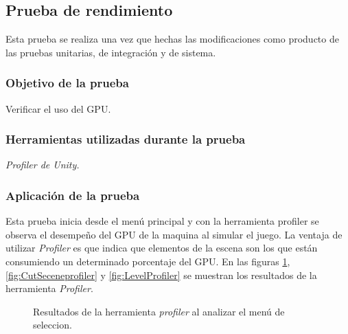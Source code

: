 \subsection{Prueba de rendimiento}
Esta prueba se realiza una vez que hechas las modificaciones como producto de las pruebas unitarias, de integración y de sistema.
\subsubsection{Objetivo de la prueba}
Verificar el uso del GPU. 
\subsubsection{Herramientas utilizadas durante la prueba}
\textit{Profiler de Unity.}
\subsubsection{Aplicación de la prueba}
Esta prueba inicia desde el menú principal y con la herramienta profiler se 
observa el desempeño del GPU de la maquina al simular el juego. La ventaja de utilizar 
\textit{Profiler} es que indica que elementos de la escena son los que están 
consumiendo un determinado porcentaje del GPU. En las figuras 
\ref{fig:MenuSelectionprofiler}, \ref{fig:CutSeceneprofiler} y 
\ref{fig:LevelProfiler} se muestran los resultados de la 
herramienta \textit{Profiler}.
\begin{figure}
  \centering
  
   
        
  \caption{Resultados de la herramienta \textit{profiler} al analizar el menú de        
  seleccion.}
  \label{fig:MenuSelectionprofiler}
\end{figure} 
